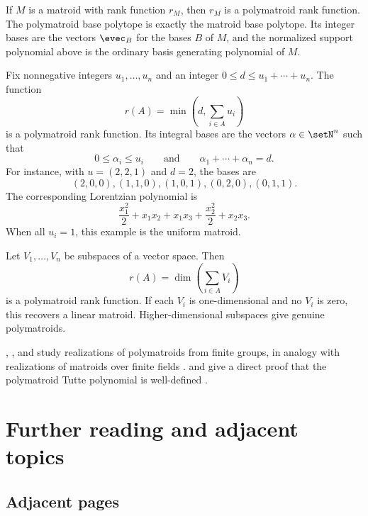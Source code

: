 \begin{example}
If $M$ is a matroid with rank function $r_M$, then $r_M$ is a polymatroid
rank function.  The polymatroid base polytope is exactly the matroid base
polytope.  Its integer bases are the vectors $\evec_B$ for the bases $B$ of
$M$, and the normalized support polynomial above is the ordinary basis
generating polynomial of $M$.
\end{example}

\begin{example}
Fix nonnegative integers $u_1,\dotsc,u_n$ and an integer
$0\leq d\leq u_1+\dotsb+u_n$.  The function
\[
  r(A)=\min\left(d,\sum_{i\in A} u_i\right)
\]
is a polymatroid rank function.  Its integral bases are the vectors
$\alpha\in\setN^n$ such that
\[
  0\leq \alpha_i\leq u_i
  \qquad \text{and} \qquad
  \alpha_1+\dotsb+\alpha_n=d.
\]
For instance, with $u=(2,2,1)$ and $d=2$, the bases are
\[
  (2,0,0), (1,1,0), (1,0,1), (0,2,0), (0,1,1).
\]
The corresponding Lorentzian polynomial is
\[
  \frac{x_1^2}{2}+x_1x_2+x_1x_3+\frac{x_2^2}{2}+x_2x_3.
\]
When all $u_i=1$, this example is the uniform matroid.
\end{example}

\begin{example}
Let $V_1,\dotsc,V_n$ be subspaces of a vector space.  Then
\[
  r(A)=\dim\left(\sum_{i\in A} V_i\right)
\]
is a polymatroid rank function.  If each $V_i$ is one-dimensional and no
$V_i$ is zero, this recovers a linear matroid.  Higher-dimensional subspaces
give genuine polymatroids.
\end{example}

, , and 
study realizations of polymatroids from finite groups, in analogy with
realizations of matroids over finite fields \cite{SwartzWentworthNiceXue2024x}.
 and  give a direct proof that the
polymatroid Tutte polynomial is well-defined \cite{GuanJin2024x}.


\section[matroidLinks]{Further reading and adjacent topics}

\subsection[matroidAdjacentPages]{Adjacent pages}

